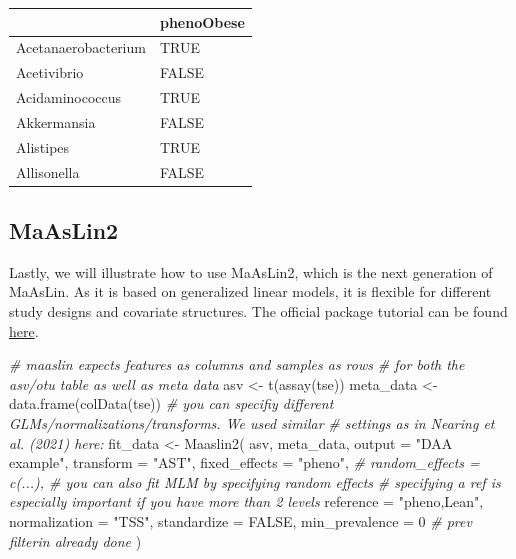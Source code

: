 \documentclass[
]{book}
\newenvironment{Shaded}{\begin{snugshade}}{\end{snugshade}}
\newcommand{\AttributeTok}[1]{\textcolor[rgb]{0.77,0.63,0.00}{#1}}
\newcommand{\CommentTok}[1]{\textcolor[rgb]{0.56,0.35,0.01}{\textit{#1}}}
\newcommand{\ConstantTok}[1]{\textcolor[rgb]{0.00,0.00,0.00}{#1}}
\newcommand{\DecValTok}[1]{\textcolor[rgb]{0.00,0.00,0.81}{#1}}
\newcommand{\FunctionTok}[1]{\textcolor[rgb]{0.00,0.00,0.00}{#1}}
\newcommand{\NormalTok}[1]{#1}
\newcommand{\OtherTok}[1]{\textcolor[rgb]{0.56,0.35,0.01}{#1}}
\newcommand{\StringTok}[1]{\textcolor[rgb]{0.31,0.60,0.02}{#1}}
\begin{document}
\begin{tabular}{l|l}
\hline
  & phenoObese\\
\hline
Acetanaerobacterium & TRUE\\
\hline
Acetivibrio & FALSE\\
\hline
Acidaminococcus & TRUE\\
\hline
Akkermansia & FALSE\\
\hline
Alistipes & TRUE\\
\hline
Allisonella & FALSE\\
\hline
\end{tabular}

\hypertarget{maaslin2}{%
\subsection{MaAsLin2}\label{maaslin2}}

Lastly, we will illustrate how to use MaAsLin2, which is the next generation of
MaAsLin. As it is based on generalized linear models, it is flexible for different study designs and covariate
structures. The official package tutorial can be found \href{https://github.com/biobakery/biobakery/wiki/maaslin2}{here}.

\begin{Shaded}
\begin{Highlighting}[]
\CommentTok{\# maaslin expects features as columns and samples as rows }
\CommentTok{\# for both the asv/otu table as well as meta data }
\NormalTok{asv }\OtherTok{\textless{}{-}} \FunctionTok{t}\NormalTok{(}\FunctionTok{assay}\NormalTok{(tse))}
\NormalTok{meta\_data }\OtherTok{\textless{}{-}} \FunctionTok{data.frame}\NormalTok{(}\FunctionTok{colData}\NormalTok{(tse))}
\CommentTok{\# you can specifiy different GLMs/normalizations/transforms. We used similar}
\CommentTok{\# settings as in Nearing et al. (2021) here:}
\NormalTok{fit\_data }\OtherTok{\textless{}{-}} \FunctionTok{Maaslin2}\NormalTok{(}
\NormalTok{  asv,}
\NormalTok{  meta\_data,}
  \AttributeTok{output =} \StringTok{"DAA example"}\NormalTok{,}
  \AttributeTok{transform =} \StringTok{"AST"}\NormalTok{,}
  \AttributeTok{fixed\_effects =} \StringTok{"pheno"}\NormalTok{,}
  \CommentTok{\# random\_effects = c(...), \# you can also fit MLM by specifying random effects}
  \CommentTok{\# specifying a ref is especially important if you have more than 2 levels}
  \AttributeTok{reference =} \StringTok{"pheno,Lean"}\NormalTok{,  }
  \AttributeTok{normalization =} \StringTok{"TSS"}\NormalTok{,}
  \AttributeTok{standardize =} \ConstantTok{FALSE}\NormalTok{,}
  \AttributeTok{min\_prevalence =} \DecValTok{0} \CommentTok{\# prev filterin already done}
\NormalTok{)}
\end{Highlighting}
\end{Shaded}
\end{document}
